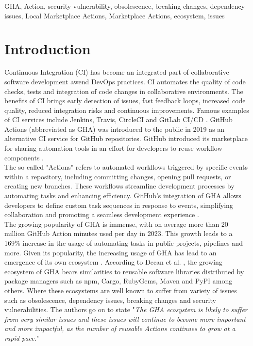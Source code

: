 \documentclass[conference]{IEEEtran}
\begin{document}
\begin{IEEEkeywords}
GHA, Action, security vulnerability, obsolescence, breaking changes, dependency issues, Local Marketplace Actions, Marketplace Actions, ecosystem, issues
\end{IEEEkeywords}

\section{Introduction}
    Continuous Integration (CI) has become an integrated part of collaborative software development awend DevOps practices. CI automates the quality of code checks, tests and integration of code changes in collaborative environments. The benefits of CI brings early detection of issues, fast feedback loops, increased code quality, reduced integration risks and continuous improvements. Famous examples of CI services include Jenkins, Travis, CircleCI and GitLab CI/CD \cite{dabbish2012social}. GitHub Actions (abbreviated as GHA) was introduced to the public in 2019 as an alternative CI service for GitHub repositories. GitHub introduced its marketplace for sharing automation tools in an effort for developers to reuse workflow components \cite{saroar2023developers}. \\ 
    The so called "Actions" refers to automated workflows triggered by specific events within a repository, including committing changes, opening pull requests, or creating new branches. These workflows streamline development processes by automating tasks and enhancing efficiency. GitHub's integration of GHA allows developers to define custom task sequences in response to events, simplifying collaboration and promoting a seamless development experience \cite{chandrasekara2021getting}. \\
    The growing popularity of GHA is immense, with on average more than 20 million GitHub Action minutes used per day in 2023. This growth leads to a 169\% increase in the usage of automating tasks in public projects,  pipelines and more\cite{github2023octoverse}. Given its popularity,  the increasing usage of GHA has lead to an emergence of its own ecosystem \cite{decan2022use}.  According to Decan et al. \cite{decan2022use}, the growing ecosystem of GHA bears similarities to reusable software libraries distributed by package managers such as npm, Cargo, RubyGems, Maven and PyPI among others. Where these ecosystems are well known to suffer from variety of issues such as obsolescence, dependency issues, breaking changes and security vulnerabilities\cite{decan2022use}. The authors go on to state "\textit{The GHA ecosystem is likely to suffer from very similar issues and these issues will continue to become more important and more impactful, as the number of reusable Actions continues to grow at a rapid pace.}"\\
\end{document}
